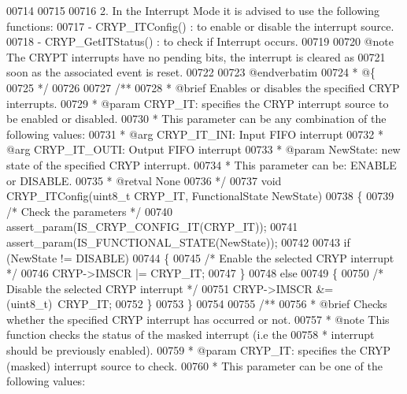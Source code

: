 \begin{DoxyCode}
00714 \textcolor{comment}{}
00715 \textcolor{comment}{}
00716 \textcolor{comment}{  2.  In the Interrupt Mode it is advised to use the following functions:}
00717 \textcolor{comment}{      - CRYP\_ITConfig()       : to enable or disable the interrupt source.}
00718 \textcolor{comment}{      - CRYP\_GetITStatus()    : to check if Interrupt occurs.}
00719 \textcolor{comment}{}
00720 \textcolor{comment}{  @note  The CRYPT interrupts have no pending bits, the interrupt is cleared as }
00721 \textcolor{comment}{         soon as the associated event is reset. }
00722 \textcolor{comment}{}
00723 \textcolor{comment}{@endverbatim}
00724 \textcolor{comment}{  * @\{}
00725 \textcolor{comment}{  */}
00726 
00727 \textcolor{comment}{/**}
00728 \textcolor{comment}{  * @brief  Enables or disables the specified CRYP interrupts.}
00729 \textcolor{comment}{  * @param  CRYP\_IT: specifies the CRYP interrupt source to be enabled or disabled.}
00730 \textcolor{comment}{  *          This parameter can be any combination of the following values:}
00731 \textcolor{comment}{  *            @arg CRYP\_IT\_INI: Input FIFO interrupt}
00732 \textcolor{comment}{  *            @arg CRYP\_IT\_OUTI: Output FIFO interrupt}
00733 \textcolor{comment}{  * @param  NewState: new state of the specified CRYP interrupt.}
00734 \textcolor{comment}{  *           This parameter can be: ENABLE or DISABLE.}
00735 \textcolor{comment}{  * @retval None}
00736 \textcolor{comment}{  */}
00737 \textcolor{keywordtype}{void} CRYP_ITConfig(uint8\_t CRYP\_IT, FunctionalState NewState)
00738 \{
00739   \textcolor{comment}{/* Check the parameters */}
00740   assert_param(IS\_CRYP\_CONFIG\_IT(CRYP\_IT));
00741   assert_param(IS\_FUNCTIONAL\_STATE(NewState));
00742 
00743   \textcolor{keywordflow}{if} (NewState != DISABLE)
00744   \{
00745     \textcolor{comment}{/* Enable the selected CRYP interrupt */}
00746     CRYP->IMSCR |= CRYP\_IT;
00747   \}
00748   \textcolor{keywordflow}{else}
00749   \{
00750     \textcolor{comment}{/* Disable the selected CRYP interrupt */}
00751     CRYP->IMSCR &= (uint8\_t)~CRYP\_IT;
00752   \}
00753 \}
00754 
00755 \textcolor{comment}{/**}
00756 \textcolor{comment}{  * @brief  Checks whether the specified CRYP interrupt has occurred or not.}
00757 \textcolor{comment}{  * @note   This function checks the status of the masked interrupt (i.e the }
00758 \textcolor{comment}{  *         interrupt should be previously enabled).     }
00759 \textcolor{comment}{  * @param  CRYP\_IT: specifies the CRYP (masked) interrupt source to check.}
00760 \textcolor{comment}{  *           This parameter can be one of the following values:}

\end{DoxyCode}
